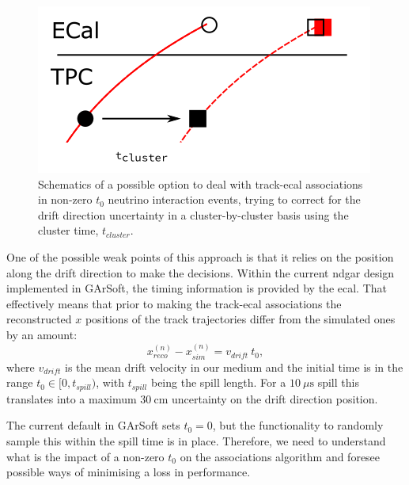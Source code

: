 \begin{figure}[t]
	\centering
	\includegraphics[width=.55\linewidth]{Images/GArSoft_PID/associations/drift_correction.png}
	\caption[Schematics of a method to deal with track-\gls{ecal} associations in non-zero $t_{0}$ neutrino interaction events using the cluster time.]{Schematics of a possible option to deal with track-\gls{ecal} associations in non-zero $t_{0}$ neutrino interaction events, trying to correct for the drift direction uncertainty in a cluster-by-cluster basis using the cluster time, $t_{cluster}$.}
	\label{fig:associations_drift}
\end{figure}

One of the possible weak points of this approach is that it relies on the position along the drift direction to make the decisions. Within the current \gls{ndgar} design implemented in GArSoft, the timing information is provided by the \gls{ecal}. That effectively means that prior to making the track-\gls{ecal} associations the reconstructed $x$ positions of the track trajectories differ from the simulated ones by an amount:
\begin{equation}
	x_{reco}^{(n)} - x_{sim}^{(n)} = v_{drift} \ t_{0},
\end{equation}
where $v_{drift}$ is the mean drift velocity in our medium and the initial time is in the range $t_{0}\in[0, t_{spill})$, with $t_{spill}$ being the spill length. For a $10 \ \mu\mathrm{s}$ spill this translates into a maximum $30 \ \mathrm{cm}$ uncertainty on the drift direction position.

The current default in GArSoft sets $t_{0} = 0$, but the functionality to randomly sample this within the spill time is in place. Therefore, we need to understand what is the impact of a non-zero $t_{0}$ on the associations algorithm and foresee possible ways of minimising a loss in performance.

